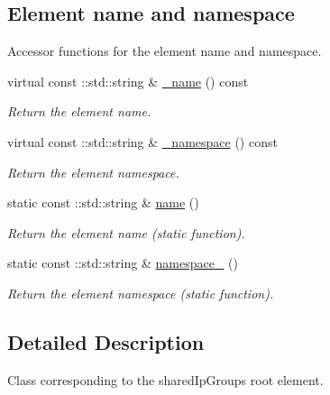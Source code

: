\subsection*{Element name and namespace}
\label{_amgrpd4b5b61f6e07390f4af2465e04571f34}
Accessor functions for the element name and namespace. \begin{DoxyCompactItemize}
\item 
virtual const ::std::string \& \hyperlink{classopenstack_1_1xml_1_1SharedIpGroups___adfb491bbc998f808f15b3fa1e178653d}{\_\-name} () const 
\begin{DoxyCompactList}\small\item\em Return the element name. \item\end{DoxyCompactList}\item 
virtual const ::std::string \& \hyperlink{classopenstack_1_1xml_1_1SharedIpGroups___a5bcb30e444654839688bcc276782bd4c}{\_\-namespace} () const 
\begin{DoxyCompactList}\small\item\em Return the element namespace. \item\end{DoxyCompactList}\item 
static const ::std::string \& \hyperlink{classopenstack_1_1xml_1_1SharedIpGroups___a8f6f720aec64744691ba1fc4928e3049}{name} ()
\begin{DoxyCompactList}\small\item\em Return the element name (static function). \item\end{DoxyCompactList}\item 
static const ::std::string \& \hyperlink{classopenstack_1_1xml_1_1SharedIpGroups___a3c6c75e12192b23fb93e87c56ce875c7}{namespace\_\-} ()
\begin{DoxyCompactList}\small\item\em Return the element namespace (static function). \item\end{DoxyCompactList}\end{DoxyCompactItemize}


\subsection{Detailed Description}
Class corresponding to the sharedIpGroups root element. 

